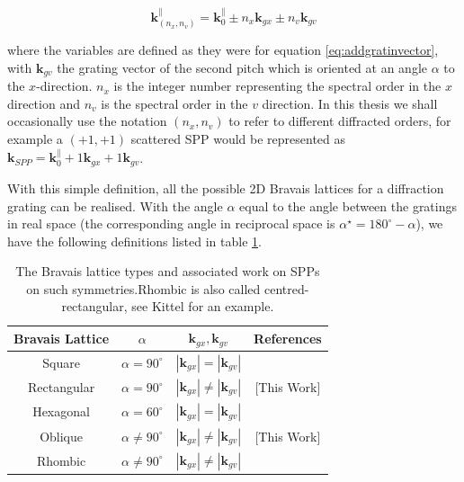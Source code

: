 \begin{equation}
\mathbf{k}_{(n_x,n_v)}^\parallel=\mathbf{k}_0^\parallel \pm n_x \mathbf{k}_{gx} \pm n_v \mathbf{k}_{gv}
\end{equation}

where the variables are defined as they were for equation \ref{eq:addgratinvector}, with $\mathbf{k}_{gv}$ the grating vector of the second pitch which is oriented at an angle $\alpha$ to the $x$-direction. $n_x$ is the integer number representing the spectral order in the $x$ direction and $n_v$ is the spectral order in the $v$ direction. In this thesis we shall occasionally use the notation $(n_x,n_v)$ to refer to different diffracted orders, for example a $(+1,+1)$ scattered SPP would be represented as $\mathbf{k}_{SPP}=\mathbf{k}_0^\parallel +1\mathbf{k}_{gx} + 1 \mathbf{k}_{gv}$.

With this simple definition, all the possible 2D Bravais lattices for a diffraction grating can be realised. With the angle $\alpha$ equal to the angle between the gratings in real space (the corresponding angle in reciprocal space is $\alpha^\star=180^\circ-\alpha$), we have the following definitions listed in table \ref{tb:bravis}.
\begin{table}
\begin{center}
\begin{tabular}{|c|c|c|c|}
\hline 
Bravais Lattice & $\alpha$ & $\mathbf{k}_{gx},\mathbf{k}_{gv}$ & References \\ 
\hline \hline \hline
Square & $\alpha=90^\circ$ & $|\mathbf{k}_{gx}|=|\mathbf{k}_{gv}|$ & \cite{Kretschmann2002a,VandeGroep2012,VanLare2012,Watts1996,Popov2008,Popov2007}\\ 
\hline 
Rectangular & $\alpha=90^\circ$ & $|\mathbf{k}_{gx}|\neq|\mathbf{k}_{gv}|$ & \cite{Tetz2010,Liu2009,Constant2012}[This Work] \\ 
\hline 
Hexagonal & $\alpha=60^\circ$ & $|\mathbf{k}_{gx}|=|\mathbf{k}_{gv}|$ & \cite{Watts1996,Kretschmann2002a,Cheong2009,Regan2012} \\ 
\hline 
Oblique & $\alpha \neq 90^\circ$ & $|\mathbf{k}_{gx}|\neq|\mathbf{k}_{gv}|$ & [This Work] \\ 
\hline
Rhombic & $\alpha\neq90^\circ$ &$|\mathbf{k}_{gx}|\neq|\mathbf{k}_{gv}|$ & \cite{Zhou2010}\\ 
\hline
\end{tabular}
\end{center}
\caption{The Bravais lattice types and associated work on SPPs on such symmetries.\label{tb:bravis} Rhombic is also called centred-rectangular, see Kittel \cite{kittel1996introduction} for an example.} 
\end{table}

